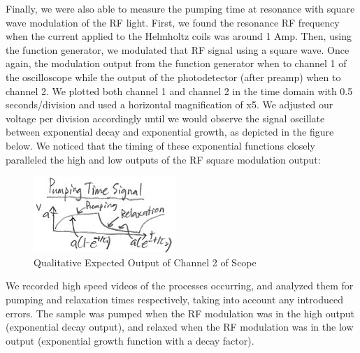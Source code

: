 \documentclass{article}
\begin{document}
    \indent Finally, we were also able to measure the pumping time at resonance with square wave modulation of the RF light. First, we found the resonance RF frequency when the current applied to the Helmholtz coils was around 1 Amp. Then, using the function generator, we modulated that RF signal using a square wave. Once again, the modulation output from the function generator when to channel 1 of the oscilloscope while the output of the photodetector (after preamp) when to channel 2. We plotted both channel 1 and channel 2 in the time domain with 0.5 seconds/division and used a horizontal magnification of x5. We adjusted our voltage per division accordingly until we would observe the signal oscillate between exponential decay and exponential growth, as depicted in the figure below. We noticed that the timing of these exponential functions closely paralleled the high and low outputs of the RF square modulation output: 
    \\\begin{figure}[H] %
        \centering
        \includegraphics[scale = 0.5]{14.jpg}
        \caption{Qualitative Expected Output of Channel 2 of Scope}
        \label{fig:my_label}
    \end{figure}
    \indent We recorded high speed videos of the processes occurring, and analyzed them for pumping and relaxation times respectively, taking into account any introduced errors. The sample was pumped when the RF modulation was in the high output (exponential decay output), and relaxed when the RF modulation was in the low output (exponential growth function with a decay factor).
\end{document}
